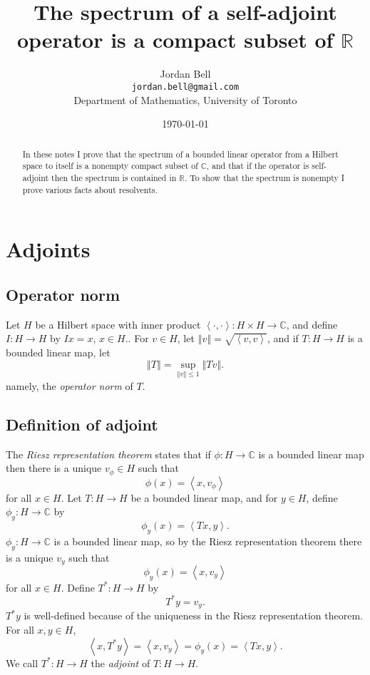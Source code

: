 \documentclass{article}
\newcommand{\inner}[2]{\left\langle #1, #2 \right\rangle}
\newcommand{\norm}[1]{\left\Vert #1 \right\Vert}
\begin{document}
\title{The spectrum of a self-adjoint operator is a compact subset of $\mathbb{R}$}
\author{Jordan Bell\\ \texttt{jordan.bell@gmail.com}\\Department of Mathematics, University of Toronto}
\date{\today}
\maketitle
\begin{abstract}
In these notes I prove that the 
spectrum of a bounded linear operator from a Hilbert space to itself is a nonempty compact subset of $\mathbb{C}$,
and that if the operator is self-adjoint then the spectrum is contained in $\mathbb{R}$. To show that the spectrum is nonempty I prove
various facts about resolvents.
\end{abstract}


\section{Adjoints}
\subsection{Operator norm}
Let $H$ be a Hilbert space with inner product $\inner{\cdot}{\cdot}:H \times H \to \mathbb{C}$, and define $I:H \to H$ by $Ix=x$, $x \in H$..
For $v \in H$, let $\norm{v} = \sqrt{\inner{v}{v}}$, and if $T:H \to H$ is a bounded linear map, let
\[
\norm{T}=\sup_{\norm{v} \leq 1} \norm{Tv}.
\]
namely, the {\em operator norm} of $T$.

\subsection{Definition of adjoint}
The {\em Riesz representation theorem} states that if $\phi:H \to \mathbb{C}$ is a bounded linear map then there is a unique $v_\phi \in H$ such that 
\[
\phi(x)=\inner{x}{v_\phi}
\]
for all $x \in H$. Let $T:H \to H$ be a bounded linear map, and for $y \in H$, define $\phi_y:H \to \mathbb{C}$ by
\[
\phi_y(x)=\inner{Tx}{y}.
\]
$\phi_y:H \to \mathbb{C}$ is a bounded linear map,
so by the Riesz representation theorem there is a unique $v_y$ such that
\[
\phi_y(x)=\inner{x}{v_y}
\]
for all $x \in H$. Define $T^*:H \to H$ by
\[
T^*y=v_y.
\]
$T^*y$ is well-defined because
of the uniqueness in the Riesz representation theorem.
For all $x, y \in H$, 
\[
\inner{x}{T^*y}=\inner{x}{v_y}=\phi_y(x)=\inner{Tx}{y}.
\]
We call $T^*:H \to H$ the {\em adjoint} of $T:H \to H$. 
\end{document}
